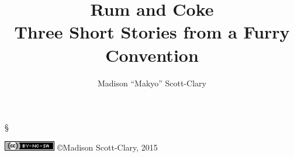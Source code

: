\documentclass[12pt,letterpaper,oneside]{memoir}
\title{\huge{Rum and Coke}\\\large{Three Short Stories from a Furry Convention}}
\author{Madison ``Makyo'' Scott-Clary}
\date{}
\newcommand\secdiv{
  \begin{center}
    \S
  \end{center}
}
\begin{document}
  \frontmatter
  \maketitle

  \secdiv
  \begin{center}
    \includegraphics[height=12pt]{by-nc-sa_inline} \copyright Madison Scott-Clary, 2015
  \end{center}

  \newpage
  \tableofcontents

  

  \mainmatter
  

  

  

  \backmatter
  
\end{document}
